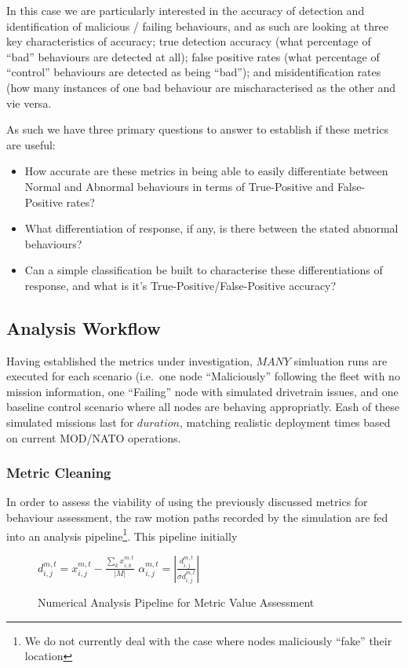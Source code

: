 \documentclass[conference]{IEEEtran}
\begin{document}
In this case we are particularly interested in the accuracy of detection and identification of malicious / failing behaviours, and as such are looking at three key characteristics of accuracy; true detection accuracy (what percentage of ``bad'' behaviours are detected at all); false positive rates (what percentage of ``control'' behaviours are detected as being ``bad''); and misidentification rates (how many instances of one bad behaviour are mischaracterised as the other and vie versa.

As such we have three primary questions to answer to establish if these metrics are useful:
\begin{itemize}
  \item How accurate are these metrics in being able to easily differentiate between Normal and Abnormal behaviours in terms of True-Positive and False-Positive rates?
  \item What differentiation of response, if any, is there between the stated abnormal behaviours?
  \item Can a simple classification be built to characterise these differentiations of response, and what is it's True-Positive/False-Positive accuracy?
\end{itemize}


\subsection{Analysis Workflow}
Having established the metrics under investigation, $MANY$ simluation runs are executed for each scenario (i.e.\ one node ``Maliciously'' following the fleet with no mission information, one ``Failing'' node with simulated drivetrain issues, and one baseline control scenario where all nodes are behaving appropriatly.
Eash of these simulated missions last for $duration$, matching realistic deployment times based on current MOD/NATO operations\cite{Bolster2014a}\cite{SomethingElse}.

\subsubsection{Metric Cleaning}
In order to assess the viability of using the previously discussed metrics for behaviour assessment, the raw motion paths recorded by the simulation are fed into an analysis pipeline\footnote{We do not currently deal with the case where nodes maliciously ``fake'' their location}.
This pipeline initially 

\begin{figure}
  \begin{algorithmic}
      \State $d_{i,j}^{m,t} = x_{i,j}^{m,t} - \frac{\sum_k x_{i,k}^{m,t}}{|M|}$
      \State $\alpha_{i,j}^{m,t} = | \frac{d_{i,j}^{m,t}}{\sigma{d_{i,j}^{m,t}}}|$
      \EndFor
    \EndFor
  \end{algorithmic}
  \caption{Numerical Analysis Pipeline for Metric Value Assessment}
  \label{fig:workflow}
\end{figure}
\end{document}
